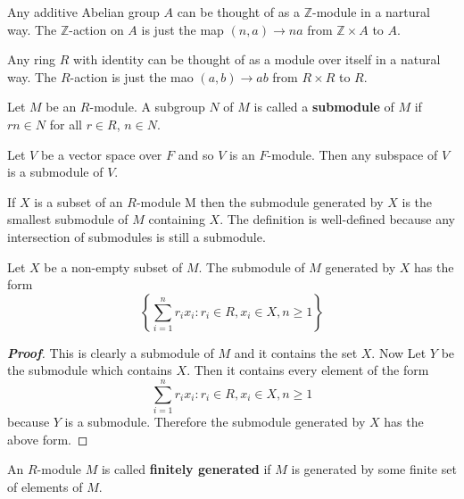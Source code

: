 \begin{example} Any additive Abelian group $A$ can be thought of as a $\mathbb{Z}$-module in a nartural way. The $\mathbb{Z}$-action on $A$ is just the map $(n,a) \rightarrow na$ from $\mathbb{Z} \times A$ to $A$.
\end{example}
\begin{example} Any ring $R$ with identity can be thought of as a module over itself in a natural way. The $R$-action is just the mao $(a,b) \rightarrow ab$ from $R \times R$ to $R$.
\end{example}
\begin{definition} Let $M$ be an $R$-module. A subgroup $N$ of $M$ is called a {\bf submodule} of $M$ if $rn \in N$ for all $r \in R$, $n \in N$.
\end{definition}
\begin{example} Let $V$ be a vector space over $F$ and so $V$ is an $F$-module. Then any subspace of $V$ is a submodule of $V$.
\end{example}
\begin{definition} If $X$ is a subset of an $R$-module M then the submodule generated by $X$ is the smallest submodule of $M$ containing $X$. The definition is well-defined because any intersection of submodules is still a submodule.
\end{definition}
\begin{lemma} Let $X$ be a non-empty subset of $M$. The submodule of $M$ generated by $X$ has the form
$$\left\{\sum_{i=1}^n r_i x_i: r_i \in R, x_i \in X, n \ge 1\right\}$$
\end{lemma}
\begin{proof}[\bf Proof] This is clearly a submodule of $M$ and it contains the set $X$. Now Let $Y$ be the submodule which contains $X$. Then it contains every element of the form
$$\sum_{i=1}^n r_i x_i: r_i \in R, x_i \in X, n \ge 1$$ because $Y$ is a submodule. Therefore the submodule generated by $X$ has the above form.
\end{proof}
\begin{definition} An $R$-module $M$ is called {\bf finitely generated} if $M$ is generated by some finite set of elements of $M$.
\end{definition}

